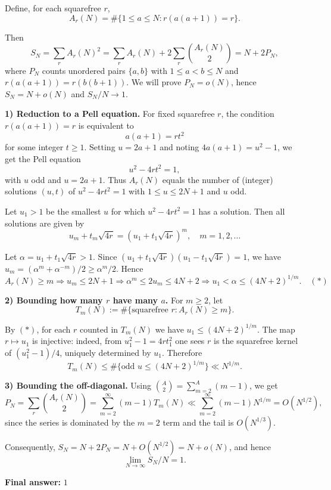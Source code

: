 \documentclass[12pt,a4paper]{article}
\theoremstyle{definition}
\begin{document}
    Define, for each squarefree $r$,
    $$A_r(N) = \#\{1 \leq a \leq N : r(a(a+1)) = r\}.$$

    Then
    $$S_N = \sum_r A_r(N)^2 = \sum_r A_r(N) + 2\sum_r \binom{A_r(N)}{2} = N + 2 P_N,$$
    where $P_N$ counts unordered pairs $\{a,b\}$ with $1 \leq a < b \leq N$ and $r(a(a+1)) = r(b(b+1))$. We will prove $P_N = o(N)$, hence $S_N = N + o(N)$ and $S_N/N \to 1$.

    \textbf{1) Reduction to a Pell equation.} For fixed squarefree $r$, the condition $r(a(a+1)) = r$ is equivalent to
    $$a(a+1) = r t^2$$
    for some integer $t \geq 1$. Setting $u = 2a+1$ and noting $4a(a+1) = u^2 - 1$, we get the Pell equation
    $$u^2 - 4 r t^2 = 1,$$
    with $u$ odd and $u = 2a+1$. Thus $A_r(N)$ equals the number of (integer) solutions $(u,t)$ of $u^2 - 4 r t^2 = 1$ with $1 \leq u \leq 2N+1$ and $u$ odd.

    Let $u_1 > 1$ be the smallest $u$ for which $u^2 - 4 r t^2 = 1$ has a solution. Then all solutions are given by
    $$u_m + t_m\sqrt{4r} = (u_1 + t_1\sqrt{4r})^m, \quad m = 1,2,\ldots$$

    Let $\alpha = u_1 + t_1\sqrt{4r} > 1$. Since $(u_1 + t_1\sqrt{4r})(u_1 - t_1\sqrt{4r}) = 1$, we have $u_m = (\alpha^m + \alpha^{-m})/2 \geq \alpha^m/2$. Hence
    $$A_r(N) \geq m \Rightarrow u_m \leq 2N+1 \Rightarrow \alpha^m \leq 2 u_m \leq 4N+2 \Rightarrow u_1 < \alpha \leq (4N+2)^{1/m}. \quad (*)$$

    \textbf{2) Bounding how many $r$ have many $a$.} For $m \geq 2$, let
    $$T_m(N) := \#\{\text{squarefree } r : A_r(N) \geq m\}.$$

    By $(*)$, for each $r$ counted in $T_m(N)$ we have $u_1 \leq (4N+2)^{1/m}$. The map $r \mapsto u_1$ is injective: indeed, from $u_1^2 - 1 = 4 r t_1^2$ one sees $r$ is the squarefree kernel of $(u_1^2 - 1)/4$, uniquely determined by $u_1$. Therefore
    $$T_m(N) \leq \#\{\text{odd } u \leq (4N+2)^{1/m}\} \ll N^{1/m}.$$

    \textbf{3) Bounding the off-diagonal.} Using $\binom{A}{2} = \sum_{m=2}^A (m-1)$, we get
    $$P_N = \sum_r \binom{A_r(N)}{2} = \sum_{m=2}^{\infty} (m-1) T_m(N) \ll \sum_{m=2}^{\infty} (m-1) N^{1/m} = O(N^{1/2}),$$
    since the series is dominated by the $m=2$ term and the tail is $O(N^{1/3})$.

    Consequently, $S_N = N + 2P_N = N + O(N^{1/2}) = N + o(N)$, and hence
    $$\lim_{N\to\infty} S_N / N = 1.$$

    \textbf{Final answer:} $1$
\end{document}
